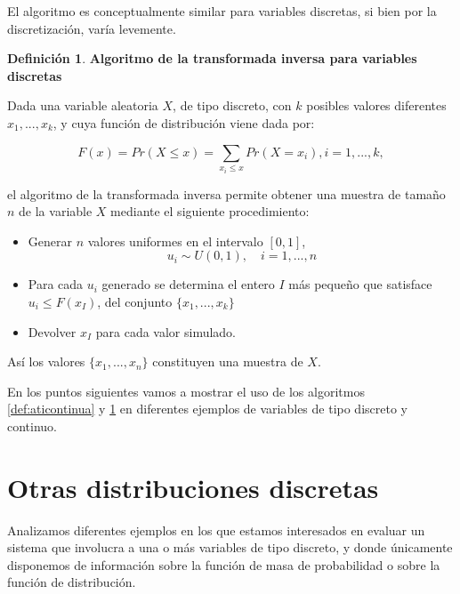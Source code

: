 \documentclass[
]{book}
\providecommand{\tightlist}{%
  \setlength{\itemsep}{0pt}\setlength{\parskip}{0pt}}
\newenvironment{yellowbox}{
  \definecolor{shadecolor}{rgb}{210, 180, 140}  
  \color{black}
  \begin{shaded}}
 {\end{shaded}}
\theoremstyle{definition}
\newtheorem{definition}{Definición}[chapter]
\theoremstyle{definition}
\theoremstyle{definition}
\theoremstyle{definition}
\theoremstyle{remark}
\begin{document}
El algoritmo es conceptualmente similar para variables discretas, si bien por la discretización, varía levemente.

\begin{yellowbox}

\begin{definition}
\protect\hypertarget{def:atidiscreta}{}\label{def:atidiscreta}\textbf{Algoritmo de la transformada inversa para variables discretas}

Dada una variable aleatoria \(X\), de tipo discreto, con \(k\) posibles valores diferentes \(x_1,...,x_k\), y cuya función de distribución viene dada por:

\[F(x) = Pr(X \leq x) = \sum_{x_i \leq x} Pr(X = x_i), i=1,...,k,\]

el algoritmo de la transformada inversa permite obtener una muestra de tamaño \(n\) de la variable \(X\) mediante el siguiente procedimiento:

\begin{itemize}
\tightlist
\item
  Generar \(n\) valores uniformes en el intervalo \([0,1]\), \[u_i\sim U(0,1), \quad i=1,...,n\]
\item
  Para cada \(u_i\) generado se determina el entero \(I\) más pequeño que satisface \(u_i \leq F(x_I)\), del conjunto \(\{x_1,...,x_k\}\)
\item
  Devolver \(x_I\) para cada valor simulado.
\end{itemize}

Así los valores \(\{x_1,...,x_n\}\) constituyen una muestra de \(X\).
\end{definition}

\end{yellowbox}

En los puntos siguientes vamos a mostrar el uso de los algoritmos \ref{def:aticontinua} y \ref{def:atidiscreta} en diferentes ejemplos de variables de tipo discreto y continuo.

\hypertarget{otras-distribuciones-discretas}{%
\section{Otras distribuciones discretas}\label{otras-distribuciones-discretas}}

Analizamos diferentes ejemplos en los que estamos interesados en evaluar un sistema que involucra a una o más variables de tipo discreto, y donde únicamente disponemos de información sobre la función de masa de probabilidad o sobre la función de distribución.
\end{document}
